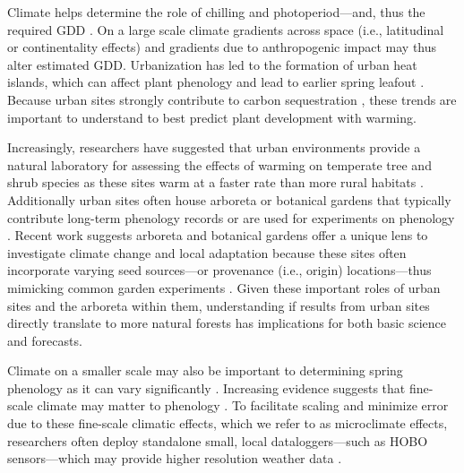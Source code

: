 \documentclass{article}\usepackage[]{graphicx}\usepackage[]{color}
\begin{document}
Climate helps determine the role of chilling and photoperiod---and, thus the required GDD \citep{Bonhomme2000}. On a large scale climate gradients across space (i.e., latitudinal or continentality effects) and gradients due to anthropogenic impact may thus alter estimated GDD. Urbanization has led to the formation of urban heat islands, which can affect plant phenology and lead to earlier spring leafout \citep{Meng2020}. Because urban sites strongly contribute to carbon sequestration \citep{Ziter2018}, these trends are important to understand to best predict plant development with warming.

Increasingly, researchers have suggested that urban environments provide a natural laboratory for assessing the effects of warming on temperate tree and shrub species as these sites warm at a faster rate than more rural habitats \citep{Grimm2008,Pickett2011}. Additionally urban sites often house arboreta or botanical gardens that typically contribute long-term phenology records \citep{Zohner2014} or are used for experiments on phenology \citep{Ettinger2018}. Recent work suggests arboreta and botanical gardens offer a unique lens to investigate climate change and local adaptation because these sites often incorporate varying seed sources---or provenance (i.e., origin) locations---thus mimicking common garden experiments \citep{Primack2009}. Given these important roles of urban sites and the arboreta within them, understanding if results from urban sites directly translate to more natural forests has implications for both basic science and forecasts.  
  
Climate on a smaller scale may also be important to determining spring phenology as it can vary significantly \citep[e.g., as much as 2.6$^{\circ}$C between sensors at the same vineyard or up to 6.6$^{\circ}$C within 1 km spatial units in northern Europe,][]{Lenoir2013,deResseguier2020}. Increasing evidence suggests that fine-scale climate may matter to phenology \citep{Lembrechts2019,Laigle2021}. To facilitate scaling and minimize error due to these fine-scale climatic effects, which we refer to as microclimate effects, researchers often deploy standalone small, local dataloggers---such as HOBO sensors---which may provide higher resolution weather data \citep{Schwartz2013a,Whiteman2000}.  
 
\end{document}
